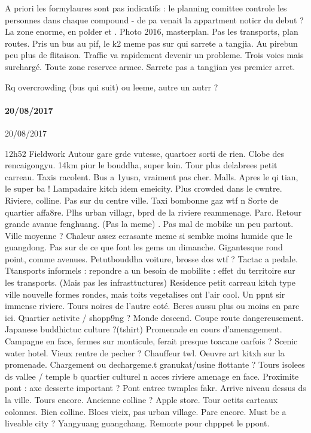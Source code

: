 A priori les formylaures sont pas indicatifs : le planning comittee controle les personnes dans chaque compound - de pa venait la appartment noticr du debut ?
La zone enorme, en polder et . Photo 2016, masterplan. Pas les transports, plan routes.
Pris un bus au pif, le k2 meme pas sur qui sarrete a tangjia. Au pirebun peu plus de flitaison.
Traffic va rapidement devenir un probleme.
Trois voies mais surchargé. Toute zone reservee armee.
Sarrete pas a tangjian yes premier arret.

Rq overcrowding (bus qui suit) ou leeme, autre un autrr ?





\paragraph{20/08/2017}{20/08/2017}


12h52
Fieldwork
Autour gare grde vutesse, quartoer sorti de rien.
Clobe des rencaigongyu. 14km piur le bouddha, super loin. Tour plus delabrees petit carreau.
Taxis racolent. Bus a 1yusn, vraiment pas cher.
Malls. Apres le qi tian, le super ba !
Lampadaire kitch idem emeicity.
Plus crowded dans le cwntre. Riviere, colline. Pas sur du centre ville.
Taxi bombonne gaz wtf n
Sorte de quartier affa8re. Plhs urban villagr, bprd de la riviere reammenage.
Parc. Retour grande avanue fenghuang. (Pas la meme) . Pas mal de mobike un peu partout.
Ville moyenne ? Chaleur assez ecrasante meme si sembke moins humide que le guangdong.
Pas sur de ce que font les gems un dimanche.
Gigantesque rond point, comme avenues.
Petutbouddha voiture, brosse dos wtf ?
Tactac a pedale. Ttansports informels : repondre a un besoin de mobilite : effet du territoire sur les transports. (Mais pas les infrasttuctures)
Residence petit carreau kitch type ville nouvelle formes rondes, mais toits vegetalises ont l'air cool.
Un ppnt sir immense riviere. Tours noires de l'autre coté.
Beres aussu plus ou moins en parc ici. Quartier activite / shopp9ng ? Monde descend.
Coupe route dangereusement.
Japanese buddhictuc culture ?(tshirt)
Promenade en cours d'amenagement.
Campagne en face, fermes sur monticule, ferait presque toacane oarfois ?
Scenic water hotel.
Vieux rentre de pecher ?
Chauffeur twl.
Oeuvre art kitxh sur la promenade.
Chargement ou dechargeme.t granukat/usine flottante ?
Tours isolees ds vallee / temple b quartier culturel n acces riviere amenage en face.
Proximite pont : axe desserte important ?
Pont entree twmples fakr.
Arrive niveau dessus ds la ville. Tours encore. Ancienne colline ?
Apple store.
Tour oetits carteaux colonnes. Bien colline. Blocs vieix, pas urban village. Parc encore. Must be a liveable city ?
Yangyuang guangchang.
Remonte pour chpppet le ppont.



